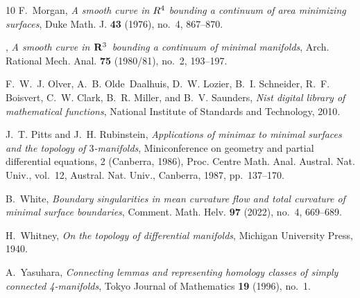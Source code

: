 \documentclass[11pt, reqno]{amsart}
\numberwithin{equation}{section}
\begin{document}
\begin{thebibliography}{10}
	F.~Morgan, \emph{A smooth curve in {$R\sp{4}$} bounding a continuum of area
		minimizing surfaces}, Duke Math. J. \textbf{43} (1976), no.~4, 867--870.
	
	\bysame, \emph{A smooth curve in {${\bf R}\sp{3}$}\ bounding a continuum of
		minimal manifolds}, Arch. Rational Mech. Anal. \textbf{75} (1980/81), no.~2,
	193--197.
	
	F.~W.~J. Olver, A.~B. Olde~Daalhuis, D.~W. Lozier, B.~I. Schneider, R.~F.
	Boisvert, C.~W. Clark, B.~R. Miller, and B.~V. Saunders, \emph{Nist digital
		library of mathematical functions}, National Institute of Standards and
	Technology, 2010.
	
	J.~T. Pitts and J.~H. Rubinstein, \emph{Applications of minimax to minimal
		surfaces and the topology of {$3$}-manifolds}, Miniconference on geometry and
	partial differential equations, 2 ({C}anberra, 1986), Proc. Centre Math.
	Anal. Austral. Nat. Univ., vol.~12, Austral. Nat. Univ., Canberra, 1987,
	pp.~137--170.
	
	B.~White, \emph{Boundary singularities in mean curvature flow and total
		curvature of minimal surface boundaries}, Comment. Math. Helv. \textbf{97}
	(2022), no.~4, 669--689.
	
	H.~Whitney, \emph{On the topology of differential manifolds}, Michigan
	University Press, 1940.
	
	A.~Yasuhara, \emph{Connecting lemmas and representing homology classes of
		simply connected 4-manifolds}, Tokyo Journal of Mathematics \textbf{19}
	(1996), no.~1.
	
\end{thebibliography}
\end{document}
